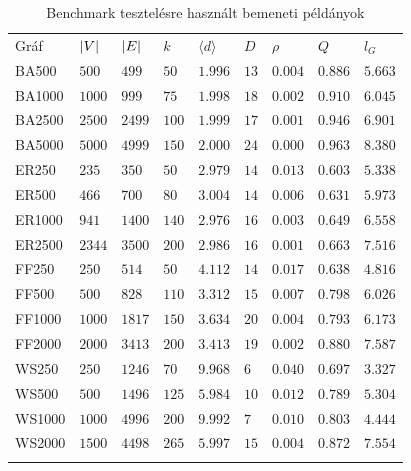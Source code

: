 \begin{table}[b]
  \centering
  \caption{Benchmark tesztelésre használt bemeneti példányok}\label{tab:BENCHMARK_INSTANCES}
  \begin{tabularx}{\textwidth} {
      >{\raggedright\arraybackslash}X
      >{\raggedleft\arraybackslash}X
      >{\raggedleft\arraybackslash}X
      >{\raggedleft\arraybackslash}X
      >{\raggedleft\arraybackslash}X
      >{\raggedleft\arraybackslash}X
      >{\raggedleft\arraybackslash}X
      >{\raggedleft\arraybackslash}X
      >{\raggedleft\arraybackslash}X
    }
    \Xhline{4\arrayrulewidth}
    Gráf   & $\lvert V\rvert$ & $\lvert E\rvert$ & $k$   & $\langle d \rangle$ & $D$  & $\rho$  & $Q$     & $l_G$   \\
    \Xhline{4\arrayrulewidth}
    BA500  & $500$     & $499$     & $50$  & $1.996$             & $13$ & $0.004$ & $0.886$ & $5.663$ \\
    BA1000 & $1000$    & $999$     & $75$  & $1.998$             & $18$ & $0.002$ & $0.910$ & $6.045$ \\
    BA2500 & $2500$    & $2499$    & $100$ & $1.999$             & $17$ & $0.001$ & $0.946$ & $6.901$ \\
    BA5000 & $5000$    & $4999$    & $150$ & $2.000$             & $24$ & $0.000$ & $0.963$ & $8.380$ \\
    \hline
    ER250  & $235$     & $350$     & $50$  & $2.979$             & $14$ & $0.013$ & $0.603$ & $5.338$ \\
    ER500  & $466$     & $700$     & $80$  & $3.004$             & $14$ & $0.006$ & $0.631$ & $5.973$ \\
    ER1000 & $941$     & $1400$    & $140$ & $2.976$             & $16$ & $0.003$ & $0.649$ & $6.558$ \\
    ER2500 & $2344$    & $3500$    & $200$ & $2.986$             & $16$ & $0.001$ & $0.663$ & $7.516$ \\
    \hline
    FF250  & $250$     & $514$     & $50$  & $4.112$             & $14$ & $0.017$ & $0.638$ & $4.816$ \\
    FF500  & $500$     & $828$     & $110$ & $3.312$             & $15$ & $0.007$ & $0.798$ & $6.026$ \\
    FF1000 & $1000$    & $1817$    & $150$ & $3.634$             & $20$ & $0.004$ & $0.793$ & $6.173$ \\
    FF2000 & $2000$    & $3413$    & $200$ & $3.413$             & $19$ & $0.002$ & $0.880$ & $7.587$ \\
    \hline
    WS250  & $250$     & $1246$    & $70$  & $9.968$             & $6$  & $0.040$ & $0.697$ & $3.327$ \\
    WS500  & $500$     & $1496$    & $125$ & $5.984$             & $10$ & $0.012$ & $0.789$ & $5.304$ \\
    WS1000 & $1000$    & $4996$    & $200$ & $9.992$             & $7$  & $0.010$ & $0.803$ & $4.444$ \\
    WS2000 & $1500$    & $4498$    & $265$ & $5.997$             & $15$ & $0.004$ & $0.872$ & $7.554$ \\
    \Xhline{4\arrayrulewidth}
  \end{tabularx}
\end{table}


